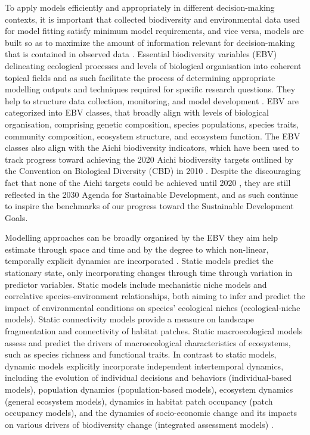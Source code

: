 \documentclass[titlesmallcaps,copyrightpage]{uomthesis}\usepackage[]{graphicx}\usepackage[]{color}
\begin{document}
To apply models efficiently and appropriately in different decision-making contexts, it is important that collected biodiversity and environmental data used for model fitting satisfy minimum model requirements, and vice versa, models are built so as to maximize the amount of information relevant for decision-making that is contained in observed data \citep{ipbes_summary_2016}. Essential biodiversity variables (EBV) delineating ecological processes and levels of biological organisation into coherent topical fields \citep{pereira_essential_2013} and as such facilitate the process of determining appropriate modelling outputs and techniques required for specific research questions. They help to structure data collection, monitoring, and model development \citep{pereira_essential_2013, ipbes_summary_2016}. EBV are categorized into EBV classes, that broadly align with levels of biological organisation, comprising genetic composition, species populations, species traits, community composition, ecosystem structure, and ecosystem function. The EBV classes also align with the Aichi biodiversity indicators, which have been used to track progress toward achieving the 2020 Aichi biodiversity targets outlined by the Convention on Biological Diversity (CBD) in 2010 \citep{scbd_global_2010, butchart_global_2010}. Despite the discouraging fact that none of the Aichi targets could be achieved until 2020 \citep{scbd_global_2010}, they are still reflected in the 2030 Agenda for Sustainable Development, and as such continue to inspire the benchmarks of our progress toward the Sustainable Development Goals.

Modelling approaches can be broadly organised by the EBV they aim help estimate through space and time and by the degree to which non-linear, temporally explicit dynamics are incorporated \citep[static versus dynamic models,][]{zurell_spatially-explicit_2021}. Static models predict the stationary state, only incorporating changes through time through variation in predictor variables. Static models include mechanistic niche models and correlative species-environment relationships, both aiming to infer and predict the impact of environmental conditions on species' ecological niches (ecological-niche models). Static connectivity models provide a measure on landscape fragmentation and connectivity of habitat patches. Static macroecological models assess and predict the drivers of macroecological characteristics of ecosystems, such as species richness and functional traits. In contrast to static models, dynamic models explicitly incorporate independent intertemporal dynamics, including the evolution of individual decisions and behaviors (individual-based models), population dynamics (population-based models), ecosystem dynamics (general ecosystem models), dynamics in habitat patch occupancy (patch occupancy models), and the dynamics of socio-economic change and its impacts on various drivers of biodiversity change (integrated assessment models) \citep{zurell_spatially-explicit_2021}.
\end{document}

